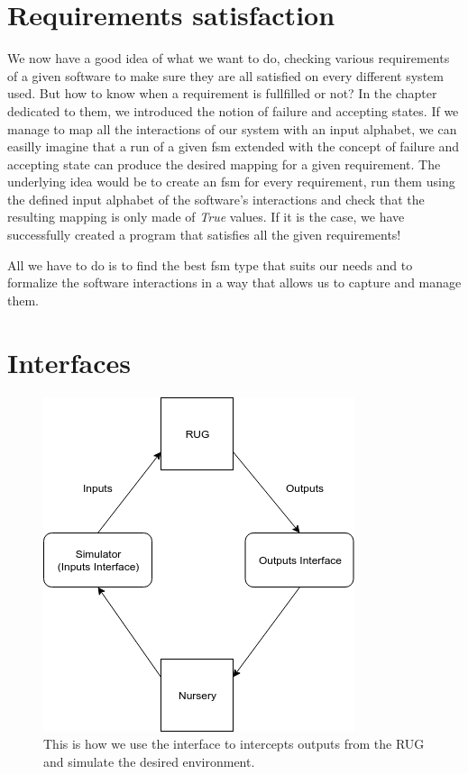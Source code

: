\documentclass[12pt]{article}
\theoremstyle{definition}
\theoremstyle{definition}
\theoremstyle{remark}
\begin{document}

\section{Requirements satisfaction}


We now have a good idea of what we want to do, checking various requirements of a given software to make sure they are all satisfied on every different system used. But how to know when a requirement is fullfilled or not? In the chapter dedicated to them, we introduced the notion of failure and accepting states. If we manage to map all the interactions of our system with an input alphabet, we can easilly imagine that a run of a given \gls{fsm} extended with the concept of failure and accepting state can produce the desired mapping for a given requirement. The underlying idea would be to create an \gls{fsm} for every requirement, run them using the defined input alphabet of the software's interactions and check that the resulting mapping is only made of \textit{True} values. If it is the case, we have successfully created a program that satisfies all the given requirements!

All we have to do is to find the best \gls{fsm} type that suits our needs and to formalize the software interactions in a way that allows us to capture and manage them.



\section{Interfaces}


\begin{figure}
    \centering
    \includegraphics[scale=0.8]{rug_io_simulation.png}
    \caption{This is how we use the interface to intercepts outputs from the RUG and simulate the desired environment.}
    \label{rug_io_simulation}
\end{figure}
\end{document}
